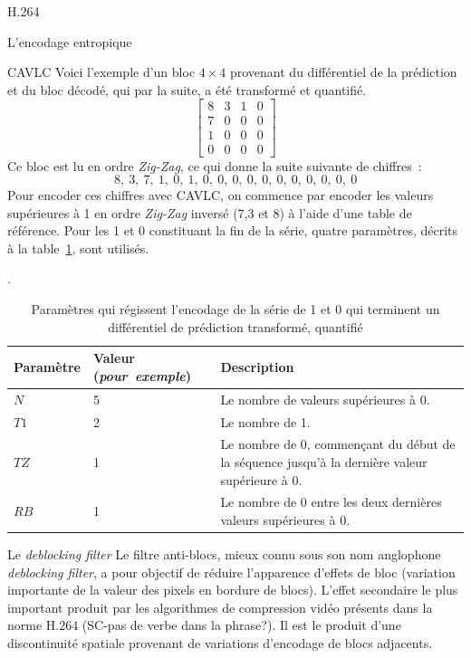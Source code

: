 \documentclass{article}
\begin{document}
\begin{section}{H.264}
\begin{subsection}{L'encodage entropique}
\begin{subsubsection}{CAVLC}
Voici l'exemple d'un bloc $4 \times 4$ provenant du différentiel de la
prédiction et du bloc décodé, qui par la suite, a été transformé et quantifié.
\begin{equation*}
\begin {bmatrix}
8 & 3 & 1 & 0\\
7 & 0 & 0 & 0\\
1 & 0 & 0 & 0\\
0 & 0 & 0 & 0
\end{bmatrix}
\end{equation*}
Ce bloc est lu en ordre \textit{Zig-Zag}, ce qui donne la suite suivante de
chiffres~:
\begin{equation*}
8,~3,~7,~1,~0,~1,~0,~0,~0,~0,~0,~0,~0,~0,~0,~0,~0 
\end{equation*}
Pour encoder ces chiffres avec CAVLC, on commence par encoder les valeurs
supérieures à 1 en ordre \textit{Zig-Zag} inversé (7,3 et 8) à l'aide d'une
table de référence. Pour les 1 et 0 constituant la fin de la série, quatre
paramètres, décrits à la table~\ref{tab-CAVLC}, sont utilisés.

\begin{table}[htb]
\caption{Paramètres qui régissent l'encodage de la série de 1 et 0 qui terminent
un différentiel de prédiction transformé, quantifié}.
\label{tab-CAVLC}
\vspace{1em}
\centering
\small
\begin{tabular}{ l p{} p{7cm} }
 \hline
 Paramètre & Valeur (\textit{pour~exemple}) & Description  \\
 \hline
$N$ & 5 &Le nombre de valeurs supérieures à 0.\\
$T1$ & 2 &Le nombre de 1.\\
$TZ$ & 1 &Le nombre de 0, commençant du début de la séquence jusqu'à la dernière
valeur supérieure à 0.\\
$RB$ & 1 &Le nombre de 0 entre les deux dernières valeurs supérieures à 0.\\
\hline   
\end{tabular}
\end{table}

\end{subsubsection}

\end{subsection}

\begin{subsection}{Le \textit{deblocking filter}}
Le filtre anti-blocs, mieux connu sous son nom anglophone \textit{deblocking
filter}, a pour objectif de réduire l'apparence d'effets de bloc (variation
importante de la valeur des pixels en bordure de blocs). L'effet secondaire le
plus important produit par les algorithmes de compression vidéo présents dans la
norme H.264 (SC-pas de verbe dans la phrase?). Il est le produit d'une discontinuité spatiale provenant de
variations d'encodage de blocs adjacents.


\end{subsection}
\end{section}
\end{document}
